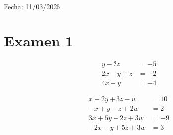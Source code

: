 \hspace*{-0.64cm}
Fecha: 11/03/2025

\section{Examen 1}

\begin{equation}
\begin{aligned}
y - 2z &= -5 \\
2x - y + z &= -2 \\
4x - y &= -4
\end{aligned}
\end{equation}

\begin{equation}
    \begin{aligned}
    x - 2y + 3z -w &= 10 \\
    -x + y - z +2w &= 2 \\
    3x + 5y -2z +3w &= -9 \\
    -2x - y +5z +3w &= 3 
    \end{aligned}
    \end{equation}

